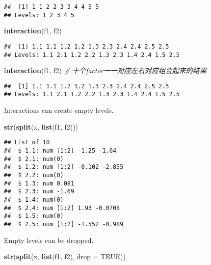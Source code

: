 \documentclass[
]{article}
\newenvironment{Shaded}{\begin{snugshade}}{\end{snugshade}}
\newcommand{\CommentTok}[1]{\textcolor[rgb]{0.56,0.35,0.01}{\textit{#1}}}
\newcommand{\DataTypeTok}[1]{\textcolor[rgb]{0.13,0.29,0.53}{#1}}
\newcommand{\KeywordTok}[1]{\textcolor[rgb]{0.13,0.29,0.53}{\textbf{#1}}}
\newcommand{\NormalTok}[1]{#1}
\newcommand{\OtherTok}[1]{\textcolor[rgb]{0.56,0.35,0.01}{#1}}
\begin{document}
\begin{verbatim}
##  [1] 1 1 2 2 3 3 4 4 5 5
## Levels: 1 2 3 4 5
\end{verbatim}

\begin{Shaded}
\begin{Highlighting}[]
\KeywordTok{interaction}\NormalTok{(f1, f2)}
\end{Highlighting}
\end{Shaded}

\begin{verbatim}
##  [1] 1.1 1.1 1.2 1.2 1.3 2.3 2.4 2.4 2.5 2.5
## Levels: 1.1 2.1 1.2 2.2 1.3 2.3 1.4 2.4 1.5 2.5
\end{verbatim}

\begin{Shaded}
\begin{Highlighting}[]
\KeywordTok{interaction}\NormalTok{(f1, f2) }\CommentTok{\# 十个factor一一对应左右对应组合起来的结果}
\end{Highlighting}
\end{Shaded}

\begin{verbatim}
##  [1] 1.1 1.1 1.2 1.2 1.3 2.3 2.4 2.4 2.5 2.5
## Levels: 1.1 2.1 1.2 2.2 1.3 2.3 1.4 2.4 1.5 2.5
\end{verbatim}

Interactions can create empty levels.

\begin{Shaded}
\begin{Highlighting}[]
\KeywordTok{str}\NormalTok{(}\KeywordTok{split}\NormalTok{(x, }\KeywordTok{list}\NormalTok{(f1, f2)))}
\end{Highlighting}
\end{Shaded}

\begin{verbatim}
## List of 10
##  $ 1.1: num [1:2] -1.25 -1.64
##  $ 2.1: num(0) 
##  $ 1.2: num [1:2] -0.102 -2.855
##  $ 2.2: num(0) 
##  $ 1.3: num 0.081
##  $ 2.3: num -1.69
##  $ 1.4: num(0) 
##  $ 2.4: num [1:2] 1.93 -0.0708
##  $ 1.5: num(0) 
##  $ 2.5: num [1:2] -1.552 -0.989
\end{verbatim}

Empty levels can be dropped.

\begin{Shaded}
\begin{Highlighting}[]
\KeywordTok{str}\NormalTok{(}\KeywordTok{split}\NormalTok{(x, }\KeywordTok{list}\NormalTok{(f1, f2), }\DataTypeTok{drop =} \OtherTok{TRUE}\NormalTok{))}
\end{Highlighting}
\end{Shaded}
\end{document}
